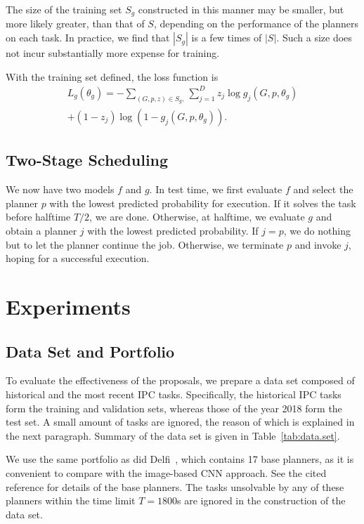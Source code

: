 \documentclass[letterpaper]{article} %
\begin{document}
The size of the training set $S_g$ constructed in this manner may be smaller, but more likely greater, than that of $S$, depending on the performance of the planners on each task. In practice, we find that $|S_g|$ is a few times of $|S|$. Such a size does not incur substantially more expense for training.

With the training set defined, the loss function is
\begin{multline*}
L_g(\theta_g)=-\sum_{(G,p,z)\in S_g,}\sum_{j=1}^D z_j\log g_j(G,p,\theta_g)\\
+(1-z_j)\log (1-g_j(G,p,\theta_g)).
\end{multline*}


\subsection{Two-Stage Scheduling}
We now have two models $f$ and $g$. In test time, we first evaluate $f$ and select the planner $p$ with the lowest predicted probability for execution. If it solves the task before halftime $T/2$, we are done. Otherwise, at halftime, we evaluate $g$ and obtain a planner $j$ with the lowest predicted probability. If $j=p$, we do nothing but to let the planner continue the job. Otherwise, we terminate $p$ and invoke $j$, hoping for a successful execution.


\section{Experiments}


\subsection{Data Set and Portfolio}
To evaluate the effectiveness of the proposals, we prepare a data set composed of historical and the most recent IPC tasks.
Specifically, the historical IPC tasks form the training and validation sets, whereas those of the year 2018 form the test set. A small amount of tasks are ignored, the reason of which is explained in the next paragraph. Summary of the data set is given in Table~\ref{tab:data.set}.

We use the same portfolio as did Delfi~\cite{katz-et-al-ipc2018}, which contains 17 base planners, as it is convenient to compare with the image-based CNN approach. See the cited reference for details of the base planners. The tasks unsolvable by any of these planners within the time limit $T=1800$s are ignored in the construction of the data set.
\end{document}
